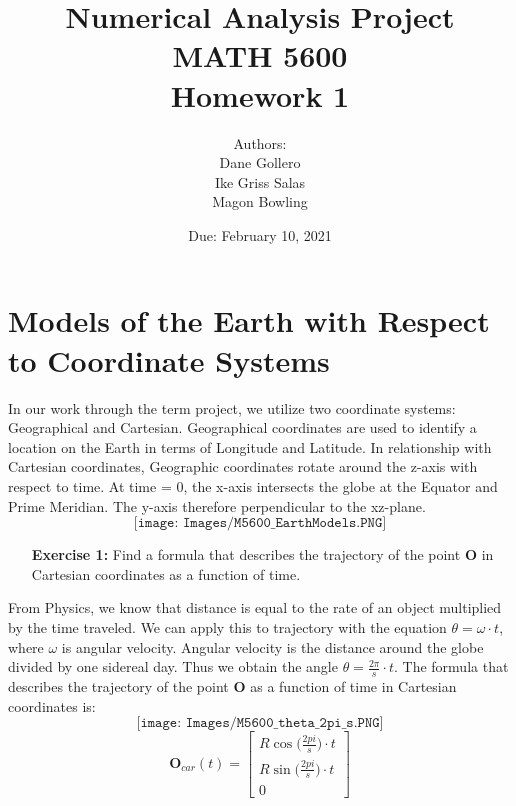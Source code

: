 \documentclass[11pt]{article}
\theoremstyle{definition}
\newcommand{\1}[1]{\mathbf{1} \left \{ #1 \right \}}
\begin{document}
\title{Numerical Analysis Project \\ MATH 5600 \\ Homework 1}
\date{Due: February 10, 2021}
\author{Authors: \\ Dane Gollero \\ Ike Griss Salas \\ Magon Bowling}

\maketitle

\section*{\textbf{Models of the Earth with Respect to Coordinate Systems}}
In our work through the term project, we utilize two coordinate systems: Geographical and Cartesian.  Geographical coordinates are used to identify a location on the Earth in terms of Longitude and Latitude.  In relationship with Cartesian coordinates, Geographic coordinates rotate around the z-axis with respect to time.  At time = 0, the x-axis intersects the globe at the Equator and Prime Meridian.  The y-axis therefore perpendicular to the xz-plane.
\[\texttt{[image: Images/M5600\_EarthModels.PNG]}\]

\begin{itemize}
\item[{\textbf{Exercise 1:}}] Find a formula that describes the trajectory of the point \textbf{O} in Cartesian coordinates as a function of time.
\end{itemize}
From Physics, we know that distance is equal to the rate of an object multiplied by the time traveled.  We can apply this to trajectory with the equation $\theta = \omega \cdot t$, where $\omega$ is angular velocity.  Angular velocity is the distance around the globe divided by one sidereal day.  Thus we obtain the angle $\theta = \frac{2\pi}{s} \cdot t$.  The formula that describes the trajectory of the point \textbf{O} as a function of time in Cartesian coordinates is: \\
\[\texttt{[image: Images/M5600\_theta\_2pi\_s.PNG]}\]
\[\textbf{O}_{car}(t) =
\begin{bmatrix}
R \cos{\big(\frac{2pi}{s}\big) \cdot t} \\
R \sin{\big(\frac{2pi}{s}\big) \cdot t} \\
0 \end{bmatrix} \]
\end{document}
